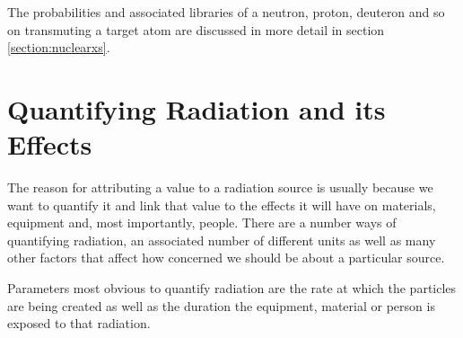 The probabilities and associated libraries of a neutron, proton, deuteron and so on transmuting a target atom are discussed in more detail in section \ref{section:nuclearxs}.


\FloatBarrier




\section{Quantifying Radiation and its Effects}

The reason for attributing a value to a radiation source is usually because we want to quantify it and link that value to the effects it will have on materials, equipment and, most importantly, people.  There are a number ways of quantifying radiation, an associated number of different units as well as many other factors that affect how concerned we should be about a particular source.

Parameters most obvious to quantify radiation are the rate at which the particles are being created as well as the duration the equipment, material or person is exposed to that radiation. 

